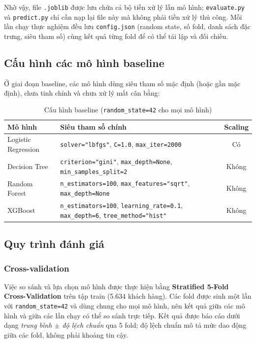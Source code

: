 Nhờ vậy, file \texttt{.joblib} được lưu chứa cả bộ tiền xử lý lẫn mô hình; \texttt{evaluate.py} và \texttt{predict.py} chỉ cần nạp lại file này mà không phải tiền xử lý thủ công. Mỗi lần chạy thực nghiệm đều lưu \texttt{config.json} (random state, số fold, danh sách đặc trưng, siêu tham số) cùng kết quả từng fold để có thể tái lập và đối chiếu.

\subsection{Cấu hình các mô hình baseline}
Ở giai đoạn baseline, các mô hình dùng siêu tham số mặc định (hoặc gần mặc định), chưa tinh chỉnh và chưa xử lý mất cân bằng:

\begin{table}[H]
\centering
\begin{tabular}{l p{9.5cm} c}
\toprule
\textbf{Mô hình} & \textbf{Siêu tham số chính} & \textbf{Scaling} \\
\midrule
Logistic Regression & \texttt{solver="lbfgs"}, \texttt{C=1.0}, \texttt{max\_iter=2000} & Có \\
Decision Tree & \texttt{criterion="gini"}, \texttt{max\_depth=None}, \texttt{min\_samples\_split=2} & Không \\
Random Forest & \texttt{n\_estimators=100}, \texttt{max\_features="sqrt"}, \texttt{max\_depth=None} & Không \\
XGBoost & \texttt{n\_estimators=100}, \texttt{learning\_rate=0.1}, \texttt{max\_depth=6}, \texttt{tree\_method="hist"} & Không \\
\bottomrule
\end{tabular}
\caption{Cấu hình baseline (\texttt{random\_state=42} cho mọi mô hình)}
\end{table}

\subsection{Quy trình đánh giá}

\subsubsection{Cross-validation}
Việc so sánh và lựa chọn mô hình được thực hiện bằng \textbf{Stratified 5-Fold Cross-Validation} trên tập train (5.634 khách hàng). Các fold được sinh một lần với \texttt{random\_state=42} và dùng chung cho mọi mô hình, nên kết quả giữa các mô hình và giữa các lần chạy có thể so sánh trực tiếp. Kết quả được báo cáo dưới dạng \textit{trung bình $\pm$ độ lệch chuẩn} qua 5 fold; độ lệch chuẩn mô tả mức dao động giữa các fold, không phải khoảng tin cậy.

